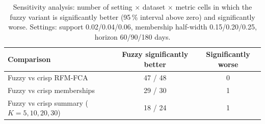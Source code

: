 \begin{table}[t]
\centering\small
\caption{Sensitivity analysis: number of setting $\times$ dataset $\times$ metric cells in which the fuzzy variant is significantly better (95\,\% interval above zero) and significantly worse. Settings: support 0.02/0.04/0.06, membership half-width 0.15/0.20/0.25, horizon 60/90/180 days.}
\label{tab:sensitivity}
\begin{tabular}{lcc}
\toprule
Comparison & Fuzzy significantly better & Significantly worse \\
\midrule
Fuzzy vs crisp RFM-FCA & 47 / 48 & 0 \\
Fuzzy vs crisp memberships & 29 / 30 & 1 \\
Fuzzy vs crisp summary ($K = 5, 10, 20, 30$) & 18 / 24 & 1 \\
\bottomrule
\end{tabular}
\end{table}
